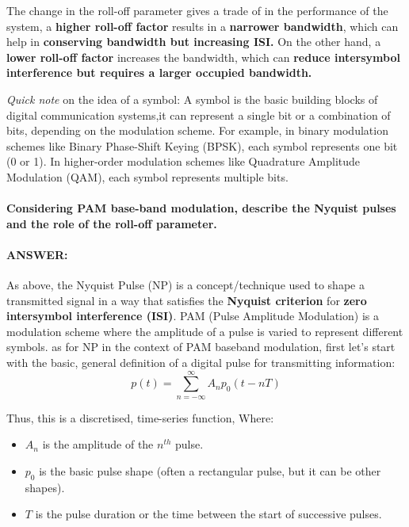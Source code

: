 \documentclass[colorlinks,11pt,a4paper,normalphoto,withhyper,ragged2e]{altareport}
\begin{document}
				The change in the roll-off parameter gives a trade of in the performance of the system, a \textbf{higher roll-off factor} results in a \textbf{narrower bandwidth}, which can help in \textbf{conserving bandwidth but increasing ISI.} On the other hand, a \textbf{lower roll-off factor} increases the bandwidth, which can \textbf{reduce intersymbol interference but requires a larger occupied bandwidth.}
			
				\textit{Quick note} on the idea of a symbol: A symbol is the basic building blocks of digital communication systems,it can represent a single bit or a combination of bits, depending on the modulation scheme. For example, in binary modulation schemes like Binary Phase-Shift Keying (BPSK), each symbol represents one bit (0 or 1). In higher-order modulation schemes like Quadrature Amplitude Modulation (QAM), each symbol represents multiple bits.
				
				
				\pagebreak
				
				\paragraph{Considering PAM base-band modulation, describe the Nyquist pulses and the role of the roll-off parameter.}
				\paragraph{ANSWER:}
				
				As above, the Nyquist Pulse (NP) is a concept/technique used to shape a transmitted signal in a way that satisfies the \textbf{Nyquist criterion} for \textbf{zero intersymbol interference (ISI)}. 
				PAM (Pulse Amplitude Modulation) is a modulation scheme where the amplitude of a pulse is varied to represent different symbols. as for NP in the context of PAM baseband modulation, first let's start with the basic, general definition of a digital pulse for transmitting information:
				\begin{equation}
					p(t) = \sum_{n=-\infty}^{\infty} A_n p_0(t - nT)
				\end{equation}\label{eqn:baseband_rep}
				
				Thus, this is a discretised, time-series function, Where:
				\begin{itemize}[leftmargin=1cm]
					\item $A_n$ is the amplitude of the $n^{th}$ pulse.
					\item $p_0$ is the basic pulse shape (often a rectangular pulse, but it can be other shapes).
					\item $T$ is the pulse duration or the time between the start of successive pulses.
				\end{itemize}
				
\end{document}
